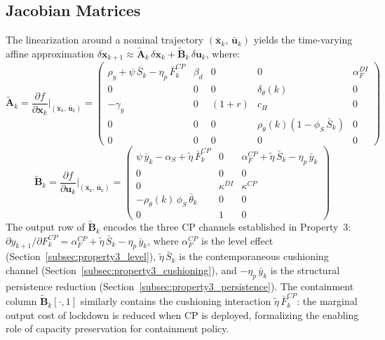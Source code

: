 \documentclass[12pt, a4paper]{article}
\begin{document}
\subsection{Jacobian Matrices}
\label{app:jacobians}

The linearization around a nominal trajectory
$(\bar{\bm{x}}_k,\, \bar{\bm{u}}_k)$ yields the time-varying affine
approximation
$\delta\bm{x}_{k+1} \approx \tilde{\bm{A}}_k\,\delta\bm{x}_k +
\tilde{\bm{B}}_k\,\delta\bm{u}_k$, where:
%
\begin{equation}
\tilde{\bm{A}}_k =
\frac{\partial f}{\partial \bm{x}_k}\bigg|_{(\bar{\bm{x}}_k,\,\bar{\bm{u}}_k)}
= \begin{pmatrix}
\rho_y + \psi\,\bar{S}_k - \eta_p\,\bar{F}_k^{CP}
    & \beta_d & 0 & 0 & \alpha_F^{DI} \\[3pt]
0 & 0 & 0 & \delta_\theta(k) & 0 \\[3pt]
-\gamma_y & 0 & (1+r) & c_H & 0 \\[3pt]
0 & 0 & 0 & \rho_\theta(k)(1-\phi_S\,\bar{S}_k) & 0 \\[3pt]
0 & 0 & 0 & 0 & 0
\end{pmatrix}
\label{eq:Ak_aug}
\end{equation}
%
\begin{equation}
\tilde{\bm{B}}_k =
\frac{\partial f}{\partial \bm{u}_k}\bigg|_{(\bar{\bm{x}}_k,\,\bar{\bm{u}}_k)}
= \begin{pmatrix}
\psi\,\bar{y}_k - \alpha_S + \tilde{\eta}\,\bar{F}_k^{CP}
    & 0
    & \alpha_F^{CP} + \tilde{\eta}\,\bar{S}_k - \eta_p\,\bar{y}_k \\[3pt]
0 & 0 & 0 \\[3pt]
0 & \kappa^{DI} & \kappa^{CP} \\[3pt]
-\rho_\theta(k)\,\phi_S\,\bar{\theta}_k & 0 & 0 \\[3pt]
0 & 1 & 0
\end{pmatrix}
\label{eq:Bk_aug}
\end{equation}
%
The output row of $\tilde{\bm{B}}_k$ encodes the three CP channels
established in Property~3:
$\partial y_{k+1}/\partial F_k^{CP} =
\alpha_F^{CP} + \tilde{\eta}\,\bar{S}_k - \eta_p\,\bar{y}_k$, where
$\alpha_F^{CP}$ is the level effect (Section~\ref{subsec:property3_level}),
$\tilde{\eta}\,\bar{S}_k$ is the contemporaneous cushioning channel
(Section~\ref{subsec:property3_cushioning}), and
$-\eta_p\,\bar{y}_k$ is the structural persistence reduction
(Section~\ref{subsec:property3_persistence}). The containment column
$\tilde{\bm{B}}_k[\cdot, 1]$ similarly contains the cushioning interaction
$\tilde{\eta}\,\bar{F}_k^{CP}$: the marginal output cost of lockdown is
reduced when CP is deployed, formalizing the enabling role of capacity
preservation for containment policy.
\end{document}
